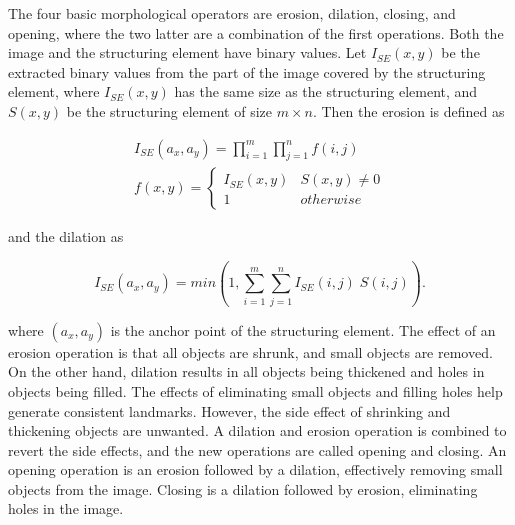 The four basic morphological operators are erosion, dilation, closing, and opening, where the two latter are a combination of the first operations. Both the image and the structuring element have binary values. Let $I_{SE}(x,y)$ be the extracted binary values from the part of the image covered by the structuring element, where $I_{SE}(x,y)$ has the same size as the structuring element, and $S(x,y)$ be the structuring element of size $m \times n$. Then the erosion is defined as 

\begin{equation}
    \begin{split}
        I_{SE}(a_x,a_y) = \prod_{i = 1}^m \prod_{j = 1}^n f(i,j) \\
        f(x,y) = 
        \begin{cases}
        I_{SE}(x,y) & S(x,y) \neq 0 \\
        1 & otherwise
        \end{cases}
    \end{split}
    \label{eq:erosion}
\end{equation}

and the dilation as

\begin{equation}
    I_{SE}(a_x,a_y) = min(1, \sum_{i = 1}^m \sum_{j = 1}^n I_{SE}(i,j) \; S(i,j)).
    \label{eq:dialation}
\end{equation}

where $(a_x,a_y)$ is the anchor point of the structuring element. The effect of an erosion operation is that all objects are shrunk, and small objects are removed. On the other hand, dilation results in all objects being thickened and holes in objects being filled. The effects of eliminating small objects and filling holes help generate consistent landmarks. However, the side effect of shrinking and thickening objects are unwanted. A dilation and erosion operation is combined to revert the side effects, and the new operations are called opening and closing. An opening operation is an erosion followed by a dilation, effectively removing small objects from the image. Closing is a dilation followed by erosion, eliminating holes in the image. 
